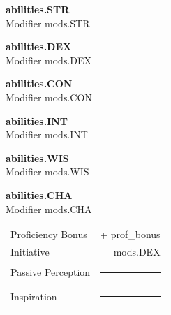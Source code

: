 \documentclass[10pt]{article}
\newcommand{\abilitycard}[3]{
\begin{tcolorbox}[title=#1]
\centering
{\Large\bfseries #2}\\[-2pt]
{\footnotesize Modifier #3}
\end{tcolorbox}
}
\begin{document}
\begin{minipage}[t]{0.28\textwidth}
\abilitycard{STR}{ {{ abilities.STR }} }{ {{ mods.STR }} }
\abilitycard{DEX}{ {{ abilities.DEX }} }{ {{ mods.DEX }} }
\abilitycard{CON}{ {{ abilities.CON }} }{ {{ mods.CON }} }
\abilitycard{INT}{ {{ abilities.INT }} }{ {{ mods.INT }} }
\abilitycard{WIS}{ {{ abilities.WIS }} }{ {{ mods.WIS }} }
\abilitycard{CHA}{ {{ abilities.CHA }} }{ {{ mods.CHA }} }

\begin{tcolorbox}[title=Core]
\begin{tabularx}{\linewidth}{l r}
Proficiency Bonus & +{{ prof_bonus }} \\
Initiative & {{ mods.DEX }} \\
Passive Perception & \rule{0.8in}{0.4pt} \\
Inspiration & \rule{0.55in}{0.4pt}
\end{tabularx}
\end{tcolorbox}
\end{minipage}\hfill
\end{document}
